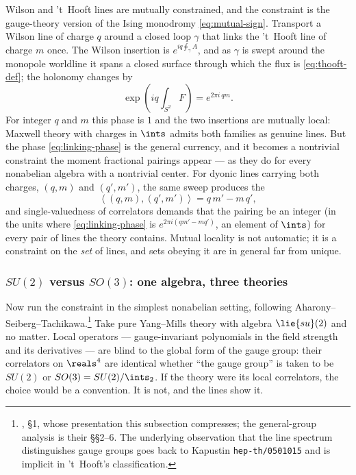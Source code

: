 Wilson and 't~Hooft lines are mutually constrained, and the constraint
is the gauge-theory version of the Ising monodromy
\eqref{eq:mutual-sign}. Transport a Wilson line of charge $q$ around a
closed loop $\gamma$ that links the 't~Hooft line of charge $m$ once.
The Wilson insertion is $e^{iq\oint_\gamma A}$, and as $\gamma$ is swept
around the monopole worldline it spans a closed surface through which
the flux is \eqref{eq:thooft-def}; the holonomy changes by
\begin{equation}
\exp\left( i q \int_{S^2} F \right) = e^{2\pi i\, q m}.
\label{eq:linking-phase}
\end{equation}
For integer $q$ and $m$ this phase is $1$ and the two insertions are
mutually local: Maxwell theory with charges in $\ints$ admits both
families as genuine lines. But the phase \eqref{eq:linking-phase} is the
general currency, and it becomes a nontrivial constraint the moment fractional pairings
appear --- as they do for every nonabelian algebra with a nontrivial
center. For dyonic lines carrying both charges, $(q, m)$ and $(q', m')$,
the same sweep produces the 
\begin{equation}
\left\langle (q,m), (q',m') \right\rangle
= q\, m' - m\, q' ,
\label{eq:dsz}
\end{equation}
and single-valuedness of correlators demands that the pairing be an
integer (in the units where \eqref{eq:linking-phase} is $e^{2\pi i (q m'
- m q')}$, an element of $\ints$) for every pair of lines the theory
contains. Mutual locality is not automatic; it is a constraint on the
\emph{set} of lines, and sets obeying it are in general far from unique.

\subsubsection{$SU(2)$ versus $SO(3)$: one algebra, three theories}
\label{sec:su2-so3}

Now run the constraint in the simplest nonabelian setting, following
Aharony--Seiberg--Tachikawa.\footnote{, \S1, whose
presentation this subsection compresses; the general-group analysis is
their \S\S2--6. The underlying observation that the line spectrum
distinguishes gauge groups goes back to
Kapustin \texttt{hep-th/0501015} and is implicit in 't~Hooft's
classification.} Take pure Yang--Mills theory with algebra $\lie{su}(2)$
and no matter. Local operators --- gauge-invariant polynomials in the
field strength and its derivatives --- are blind to the global form of
the gauge group: their correlators on $\reals^4$ are identical whether
``the gauge group'' is taken to be $SU(2)$ or $SO(3) = SU(2)/\ints_2$.
If the theory were its local correlators, the choice would be a
convention. It is not, and the lines show it.

